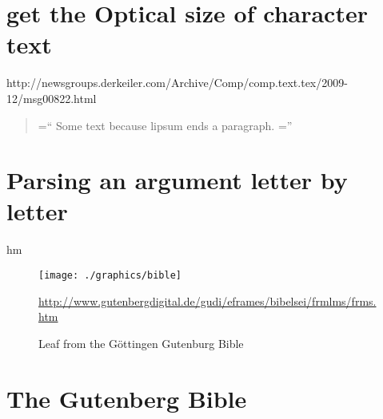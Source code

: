 {{{\section{get the Optical size of character text}
\begin{teX}
http://newsgroups.derkeiler.com/Archive/Comp/comp.text.tex/2009-12/msg00822.html

{
\newcommand{\lowbiglquote}[1][70]{%
  \setbox0=\hbox{\rm\fontsize{#1}{0}\selectfont``}%
  \setlength{\dimen0}{\ht0 - \heightof{A}}%
  \noindent\llap{\smash{\lower\dimen0\box0 }}}

\newcommand{\lowbigrquote}[1][70]{%
  \setbox0=\hbox{\fontsize{#1}{0}\selectfont''}%
  \setlength{\dimen0}{\ht0 - \heightof{A}}%
  \unskip\rlap{\smash{\lower\dimen0\box0 }}}

\begin{quotation}
\lowbiglquote \lipsum[1]
Some text because lipsum ends a paragraph.\lowbigrquote
\end{quotation}

}
\end{teX}



\section{Parsing an argument letter by letter}

\begin{teX}
\makeatletter
\newcommand*\boxedletters[1]{%
     \hbox{%
       \@tfor \next@letter := #1\do {
            \fbox\next@letter
          }%
    }%
}
\makeatother
\end{teX}

\fbox{-}\fbox{-}\fbox{-}hm 


\begin{figure*}%
\texttt{[image: ./graphics/bible]}
\caption{Leaf from the G\"ottingen Gutenburg Bible}
\url{http://www.gutenbergdigital.de/gudi/eframes/bibelsei/frmlms/frms.htm}
\label{fig:bible}
\end{figure*}

\section{The Gutenberg Bible}

}}}
